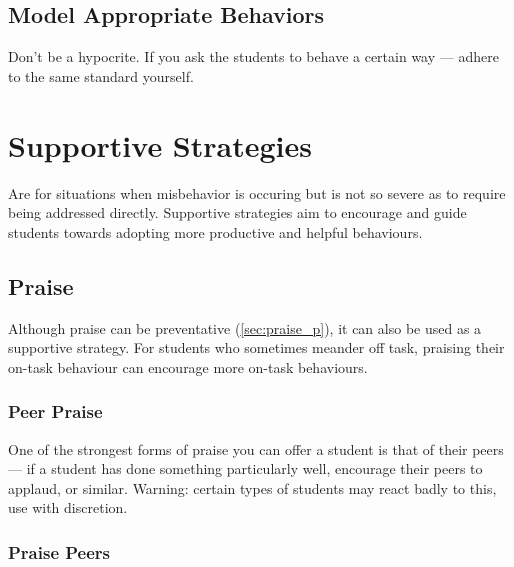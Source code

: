 \documentclass[12pt]{report}
\begin{document}
\section{Model Appropriate Behaviors}
\label{sec:model_behaviours_p}

Don't be a hypocrite. If you ask the students to behave a certain way --- adhere to the same standard yourself.


























\chapter{Supportive Strategies}
\label{chap:supportive}

Are for situations when misbehavior is occuring but is not so severe as to require being addressed directly. Supportive strategies aim to encourage and guide students towards adopting more productive and helpful behaviours. 


\section{Praise}
\label{sec:praise_s}

Although praise can be preventative (\ref{sec:praise_p}), it can also be used as a supportive strategy. For students who sometimes meander off task, praising their on-task behaviour can encourage more on-task behaviours.

\subsection{Peer Praise}
\label{sec:peer_praise_s}

One of the strongest forms of praise you can offer a student is that of their peers --- if a student has done something particularly well, encourage their peers to applaud, or similar.
Warning: certain types of students may react badly to this, use with discretion.

\subsection{Praise Peers}
\label{sec:acknowledge_good_behaviour_s}
\end{document}
